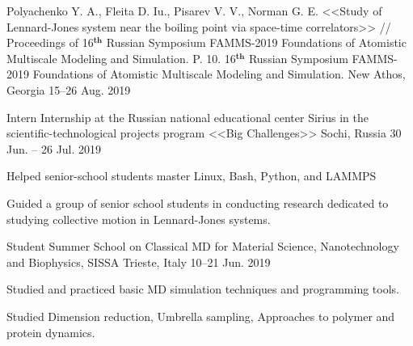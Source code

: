 \begin{cventries}

  \cventry
    {Polyachenko Y. A., Fleita D. Iu., Pisarev V. V., Norman G. E. <<Study of Lennard-Jones system near the boiling point via space-time correlators>> // Proceedings of 16$^{\textbf{th}}$ Russian Symposium FAMMS-2019 Foundations of Atomistic Multiscale Modeling and Simulation. P. 10.} %
    {16$^{\textbf{th}}$ Russian Symposium FAMMS-2019 Foundations of Atomistic Multiscale Modeling and Simulation.} %
    {New Athos, Georgia} %
    {15--26 Aug. 2019} %
    {
      \begin{cvitems} %
      \end{cvitems}
    }
    
  \cventry
    {Intern} %
    {Internship at the Russian national educational center Sirius in the scientific-technological projects program <<Big Challenges>>} %
    {Sochi, Russia} %
    {30 Jun. -- 26 Jul. 2019} %
    {
      \begin{cvitems} %
        \item {Helped senior-school students master Linux, Bash, Python, and LAMMPS}
        \item {Guided a group of senior school students in conducting research dedicated to studying collective motion in Lennard-Jones systems.}
      \end{cvitems}
    }

  \cventry
    {Student} %
    {Summer School on Classical MD for Material Science, Nanotechnology and Biophysics, SISSA} %
    {Trieste, Italy} %
    {10--21 Jun. 2019} %
    {
      \begin{cvitems} %
        \item {Studied and practiced basic MD simulation techniques and programming tools.}
        \item {Studied Dimension reduction, Umbrella sampling, Approaches to polymer and protein dynamics.}
      \end{cvitems}
    }
    
    

\end{cventries}
